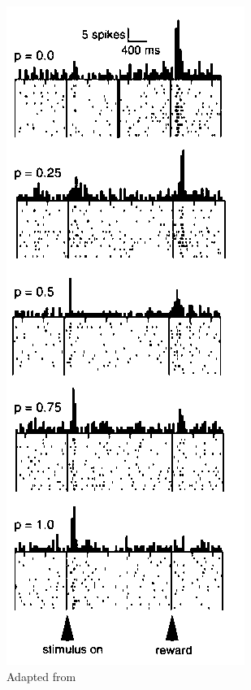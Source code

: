 \begin{figure}
    \centering
    \includegraphics[scale=0.8]{figures/Schultz1.png}
    \caption{Adapted from \cite{Fiorillo}}
    \label{fig:Fiorillo}
\end{figure}
